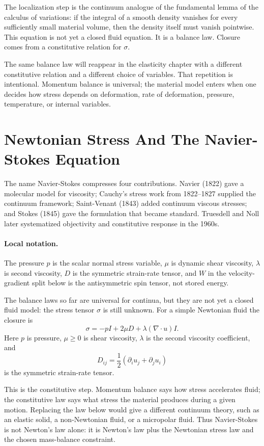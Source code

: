 The localization step is the continuum analogue of the fundamental lemma of
the calculus of variations: if the integral of a smooth density vanishes for
every sufficiently small material volume, then the density itself must vanish
pointwise. This equation is not yet a closed fluid equation. It is a balance
law. Closure comes from a constitutive relation for \(\sigma\).

The same balance law will reappear in the elasticity chapter with a different
constitutive relation and a different choice of variables. That repetition is
intentional. Momentum balance is universal; the material model enters when one
decides how stress depends on deformation, rate of deformation, pressure,
temperature, or internal variables.

\section{Newtonian Stress And The Navier-Stokes Equation}
\label{sec:navier-stokes-derivation}

The name Navier-Stokes compresses four contributions. Navier (1822) gave a
molecular model for viscosity; Cauchy's stress work from 1822--1827 supplied
the continuum framework; Saint-Venant (1843) added continuum viscous stresses;
and Stokes (1845) gave the formulation that became standard. Truesdell and
Noll later systematized objectivity and constitutive response in the 1960s.

\paragraph{Local notation.}
The pressure \(p\) is the scalar normal stress variable, \(\mu\) is dynamic
shear viscosity, \(\lambda\) is second viscosity, \(D\) is the symmetric
strain-rate tensor, and \(W\) in the velocity-gradient split below is the
antisymmetric spin tensor, not stored energy.

The balance laws so far are universal for continua, but they are not yet a
closed fluid model: the stress tensor \(\sigma\) is still unknown. For a simple
Newtonian fluid the closure is
\[
  \boxed{
  \sigma=-pI+2\mu D+\lambda(\nabla\cdot u)I.
  }
\]
Here \(p\) is pressure, \(\mu\geq0\) is shear viscosity, \(\lambda\) is the
second viscosity coefficient, and
\[
  D_{ij}=\frac12(\partial_i u_j+\partial_j u_i)
\]
is the symmetric strain-rate tensor.

This is the constitutive step.  Momentum balance says how stress accelerates
fluid; the constitutive law says what stress the material produces during a
given motion.  Replacing the law below would give a different continuum theory,
such as an elastic solid, a non-Newtonian fluid, or a micropolar fluid.  Thus
Navier-Stokes is not Newton's law alone: it is Newton's law plus the Newtonian
stress law and the chosen mass-balance constraint.

